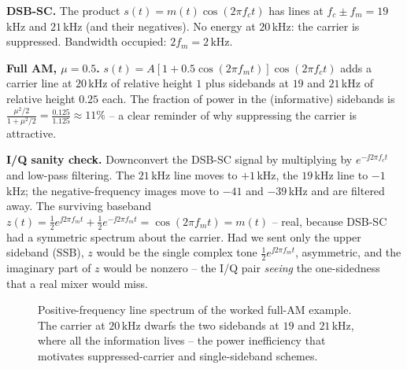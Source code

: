 \textbf{DSB-SC.} The product $s(t)=m(t)\cos(2\pi f_c t)$ has lines at
$f_c\pm f_m = 19\,$kHz and $21\,$kHz (and their negatives). No energy at $20\,$kHz: the
carrier is suppressed. Bandwidth occupied: $2f_m = 2\,$kHz.

\textbf{Full AM, $\mu=0.5$.} $s(t)=A[1+0.5\cos(2\pi f_m t)]\cos(2\pi f_c t)$ adds a
carrier line at $20\,$kHz of relative height $1$ plus sidebands at $19$ and $21\,$kHz of
relative height $0.25$ each. The fraction of power in the (informative) sidebands is
$\frac{\mu^2/2}{1+\mu^2/2} = \frac{0.125}{1.125}\approx 11\%$ -- a clear reminder of why
suppressing the carrier is attractive.

\textbf{I/Q sanity check.} Downconvert the DSB-SC signal by multiplying by
$e^{-\jj 2\pi f_c t}$ and low-pass filtering. The $21\,$kHz line moves to $+1\,$kHz, the
$19\,$kHz line to $-1\,$kHz; the negative-frequency images move to $-41$ and $-39\,$kHz
and are filtered away. The surviving baseband $z(t)=\tfrac12 e^{\jj 2\pi f_m t}+\tfrac12
e^{-\jj 2\pi f_m t}=\cos(2\pi f_m t)=m(t)$ -- real, because DSB-SC had a symmetric
spectrum about the carrier. Had we sent only the upper sideband (SSB), $z$ would be the
single complex tone $\tfrac12 e^{\jj 2\pi f_m t}$, asymmetric, and the imaginary part of
$z$ would be nonzero -- the I/Q pair \emph{seeing} the one-sidedness that a real mixer
would miss.

\begin{figure}[H]
\centering
{}
\caption{Positive-frequency line spectrum of the worked full-AM example. The carrier at
$20\,$kHz dwarfs the two sidebands at $19$ and $21\,$kHz, where all the information lives
-- the power inefficiency that motivates suppressed-carrier and single-sideband schemes.}
\label{ch23:fig-amspec}
\end{figure}

